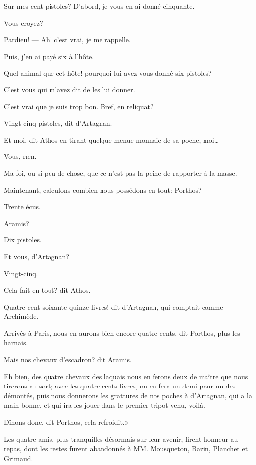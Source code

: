 \speak  Sur mes cent pistoles? D'abord, je vous en ai donné cinquante. 

\speak  Vous croyez? 

\speak  Pardieu! --- Ah! c'est vrai, je me rappelle. 

\speak  Puis, j'en ai payé six à l'hôte. 

\speak  Quel animal que cet hôte! pourquoi lui avez-vous donné six pistoles? 

\speak  C'est vous qui m'avez dit de les lui donner. 

\speak  C'est vrai que je suis trop bon. Bref, en reliquat? 

\speak  Vingt-cinq pistoles, dit d'Artagnan. 

\speak  Et moi, dit Athos en tirant quelque menue monnaie de sa poche, moi\dots 

\speak  Vous, rien. 

\speak  Ma foi, ou si peu de chose, que ce n'est pas la peine de rapporter à la masse. 

\speak  Maintenant, calculons combien nous possédons en tout: Porthos? 

\speak  Trente écus. 

\speak  Aramis? 

\speak  Dix pistoles. 

\speak  Et vous, d'Artagnan? 

\speak  Vingt-cinq. 

\speak  Cela fait en tout? dit Athos. 

\speak  Quatre cent soixante-quinze livres! dit d'Artagnan, qui comptait comme Archimède. 

\speak  Arrivés à Paris, nous en aurons bien encore quatre cents, dit Porthos, plus les harnais. 

\speak  Mais nos chevaux d'escadron? dit Aramis. 

\speak  Eh bien, des quatre chevaux des laquais nous en ferons deux de maître que nous tirerons au sort; avec les quatre cents livres, on en fera un demi pour un des démontés, puis nous donnerons les grattures de nos poches à d'Artagnan, qui a la main bonne, et qui ira les jouer dans le premier tripot venu, voilà. 

\speak  Dînons donc, dit Porthos, cela refroidit.» 

Les quatre amis, plus tranquilles désormais sur leur avenir, firent honneur au repas, dont les restes furent abandonnés à MM. Mousqueton, Bazin, Planchet et Grimaud. 

